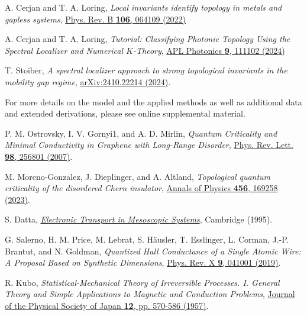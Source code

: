 \documentclass[aps,prl,amsmath,amssymb,twocolumn, superscriptaddress]{revtex4-2}
\begin{document}
\begin{thebibliography}{10}
A. Cerjan and T. A. Loring, {\em Local invariants identify topology in metals and gapless systems}, \href{https://journals.aps.org/prb/abstract/10.1103/PhysRevB.106.064109}{Phys. Rev. B {\bfseries 106}, 064109 (2022)}

A. Cerjan and T. A. Loring, {\em Tutorial: Classifying Photonic Topology Using the Spectral Localizer and Numerical $K$-Theory}, \href{https://pubs.aip.org/aip/app/article/9/11/111102/3322376/Classifying-photonic-topology-using-the-spectral}{APL Photonics {\bfseries 9}, 111102 (2024)}

T. Stoiber, {\em A spectral localizer approach to strong topological invariants in the mobility gap regime}, \href{https://arxiv.org/abs/2410.22214}{ arXiv:2410.22214 (2024)}.

For more details on the model and the applied methods as well as additional data and extended derivations, please see online supplemental material.

P. M. Ostrovsky, I. V. Gornyi1, and A. D. Mirlin, {\em Quantum Criticality and Minimal Conductivity in Graphene with Long-Range Disorder}, \href{https://journals.aps.org/prl/abstract/10.1103/PhysRevLett.98.256801}{Phys. Rev. Lett. {\bfseries 98}, 256801 (2007)}.

M. Moreno-Gonzalez, J. Dieplinger, and A. Altland, {\em Topological quantum criticality of the disordered Chern insulator}, \href{https://www.sciencedirect.com/science/article/pii/S000349162300043X?}{Annals of Physics {\bfseries 456}, 169258 (2023)}.

S. Datta, \href{https://www.cambridge.org/core/books/electronic-transport-in-mesoscopic-systems/1E55DEF5978AA7B843FF70337C220D8B}{\em Electronic Transport in Mesoscopic Systems}, Cambridge (1995).

G. Salerno, H. M. Price, M. Lebrat, S. Häusler, T. Esslinger, L. Corman, J.-P. Brantut, and N. Goldman, {\em Quantized Hall Conductance of a Single Atomic Wire: A Proposal Based on Synthetic Dimensions}, \href{https://journals.aps.org/prx/abstract/10.1103/PhysRevX.9.041001}{Phys. Rev. X {\bfseries 9}, 041001 (2019)}.

R. Kubo, {\em Statistical-Mechanical Theory of Irreversible Processes. I. General Theory and Simple Applications to Magnetic and Conduction Problems}, \href{https://journals.jps.jp/doi/10.1143/JPSJ.12.570}{Journal of the Physical Society of Japan {\bfseries 12}, pp. 570-586 (1957)}.


\end{thebibliography}
\end{document}
